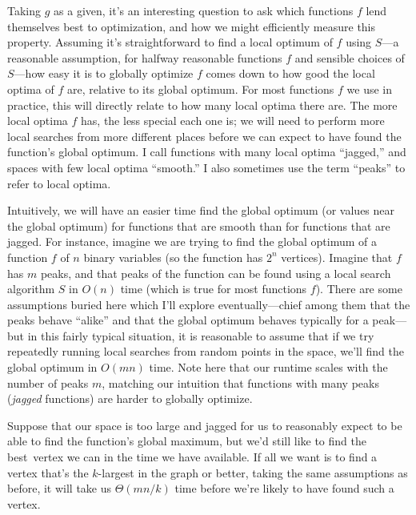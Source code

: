 \documentclass[11pt]{article}
\begin{document}
Taking $g$ as a given, it's an interesting question to ask which functions $f$ lend themselves best to optimization, and how we might efficiently measure this property. Assuming it's straightforward to find a local optimum of $f$ using $S$---a reasonable assumption, for halfway reasonable functions $f$ and sensible choices of $S$---how easy it is to globally optimize $f$ comes down to how good the local optima of $f$ are, relative to its global optimum. For most functions $f$ we use in practice, this will directly relate to how many local optima there are. The more local optima $f$ has, the less special each one is; we will need to perform more local searches from more different places before we can expect to have found the function's global optimum. I call functions with many local optima ``jagged,'' and spaces with few local optima ``smooth.'' I also sometimes use the term ``peaks'' to refer to local optima.

Intuitively, we will have an easier time find the global optimum (or values near the global optimum) for functions that are smooth than for functions that are jagged. For instance, imagine we are trying to find the global optimum of a function $f$ of $n$ binary variables (so the function has $2^n$ vertices). Imagine that $f$ has $m$ peaks, and that peaks of the function can be found using a local search algorithm $S$ in $O(n)$ time (which is true for most functions $f$). There are some assumptions buried here which I'll explore eventually---chief among them that the peaks behave ``alike'' and that the global optimum behaves typically for a peak---but in this fairly typical situation, it is reasonable to assume that if we try repeatedly running local searches from random points in the space, we'll find the global optimum in $O(mn)$ time. Note here that our runtime scales with the number of peaks $m$, matching our intuition that functions with many peaks (\emph{jagged} functions) are harder to globally optimize.

Suppose that our space is too large and jagged for us to reasonably expect to be able to find the function's global maximum, but we'd still like to find the best\footnotemark~vertex we can in the time we have available. If all we want is to find a vertex that's the $k$-largest in the graph or better, taking the same assumptions as before, it will take us $\Theta(mn/k)$ time before we're likely to have found such a vertex.

\end{document}
